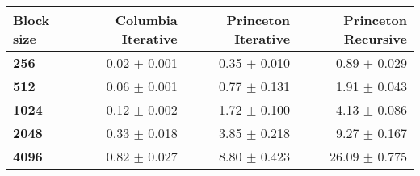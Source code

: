 \begin{tabular}{lrrr}\toprule
\textbf{Block size}  & \textbf{Columbia Iterative} & \textbf{Princeton Iterative} & \textbf{Princeton Recursive}\\\midrule
\textbf{256}  & 0.02 $\pm$ 0.001 & 0.35 $\pm$ 0.010 & 0.89 $\pm$ 0.029\\
\textbf{512}  & 0.06 $\pm$ 0.001 & 0.77 $\pm$ 0.131 & 1.91 $\pm$ 0.043\\
\textbf{1024}  & 0.12 $\pm$ 0.002 & 1.72 $\pm$ 0.100 & 4.13 $\pm$ 0.086\\
\textbf{2048}  & 0.33 $\pm$ 0.018 & 3.85 $\pm$ 0.218 & 9.27 $\pm$ 0.167\\
\textbf{4096} & 0.82 $\pm$ 0.027 & 8.80 $\pm$ 0.423 & 26.09 $\pm$ 0.775\\
\bottomrule
\end{tabular}
